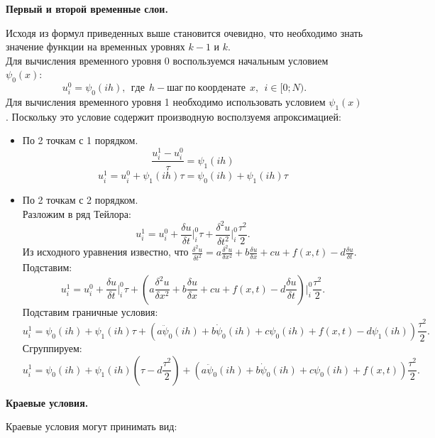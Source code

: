 \documentclass[12pt]{article}
\begin{document}
\begin{enumerate}
    \begin{center}  \textbf{Первый и второй временные слои.} \end{center}
    Исходя из формул приведенных выше становится очевидно, что необходимо знать значение функции на временных уровнях $k-1$ и $k$. \\
    Для вычисления временного уровня 0 воспользуемся начальным условием $\psi_0(x)$:
    $$u_i^0=\psi_0(ih),\:\:где\:\:h-шаг\:по\:коорденате\:\:x,\:\:i \in[0;N).$$
    Для вычисления временного уровня 1 необходимо использовать условием $\psi_1(x)$. Поскольку это условие содержит производную восползуемя апроксимацией:
    \begin{itemize}
        \item По 2 точкам с 1 порядком.
        $$\frac{u_i^1-u_i^0}{\tau}=\psi_1(ih)$$
        $$u_i^1=u_i^0+\psi_1(ih)\tau=\psi_0(ih)+\psi_1(ih)\tau$$
        \item По 2 точкам с 2 порядком.\\
        Разложим в ряд Тейлора:
        $$u_i^1 = u_i^0+\frac{\delta u}{\delta t}\bigg|_i^0 \tau+\frac{\delta^2 u}{\delta t^2}\bigg|_i^0\frac{\tau^2}{2}.$$
        Из исходного уравнения известно, что $\frac{\delta^2 u}{\delta t^2}=a\frac{\delta^2 u}{\delta x^2}+b\frac{\delta u}{\delta x}+cu+f(x,t)-
        d\frac{\delta u}{\delta t}$. Подставим:
        $$u_i^1 = u_i^0+\frac{\delta u}{\delta t}\bigg|_i^0 \tau+\left(a\frac{\delta^2 u}{\delta x^2}+b\frac{\delta u}{\delta x}+cu+f(x,t)-
        d\frac{\delta u}{\delta t}\right)\bigg|_i^0\frac{\tau^2}{2}.$$
        Подставим граничные условия:
        $$u_i^1 = \psi_0(ih)+\psi_1(ih) \tau+\left(a\ddot\psi_0(ih)+b\dot\psi_0(ih)+c\psi_0(ih)+f(x,t)-d\psi_1(ih)\right)\frac{\tau^2}{2}.$$
        Сгруппируем:
        $$u_i^1 = \psi_0(ih)+\psi_1(ih)(\tau-d\frac{\tau^2}{2})+\left(a\ddot\psi_0(ih)+b\dot\psi_0(ih)+c\psi_0(ih)+f(x,t)\right)\frac{\tau^2}{2}.$$

    \end{itemize}

    \begin{center}  \textbf{Краевые условия.} \end{center}
    Краевые условия могут принимать вид:


\end{enumerate}
\end{document}
